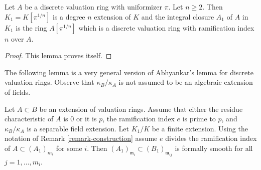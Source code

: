 \begin{lemma}
\label{lemma-pull-root-uniformizer}
Let $A$ be a discrete valuation ring with uniformizer $\pi$.
Let $n \geq 2$. Then $K_1 = K[\pi^{1/n}]$ is a degree $n$ extension of $K$
and the integral closure $A_1$ of $A$ in $K_1$ is the ring $A[\pi^{1/n}]$
which is a discrete valuation ring with ramification index $n$ over $A$.
\end{lemma}

\begin{proof}
This lemma proves itself.
\end{proof}

\noindent
The following lemma is a very general version of
Abhyankar's lemma for discrete valuation rings.
Observe that $\kappa_B/\kappa_A$ is not assumed
to be an algebraic extension of fields.

\begin{lemma}
\label{lemma-abhyankar}
Let $A \subset B$ be an extension of valuation rings.
Assume that either the residue characteristic of $A$ is $0$
or it is $p$, the ramification index $e$ is prime to $p$, and
$\kappa_B/\kappa_A$ is a separable field extension.
Let $K_1/K$ be a finite extension. Using the notation of
Remark \ref{remark-construction}
assume $e$ divides the ramification index of $A \subset (A_1)_{m_i}$
for some $i$. Then $(A_1)_{\mathfrak m_i} \subset (B_1)_{\mathfrak m_{ij}}$
is formally smooth for all $j = 1, \ldots, m_i$.
\end{lemma}

